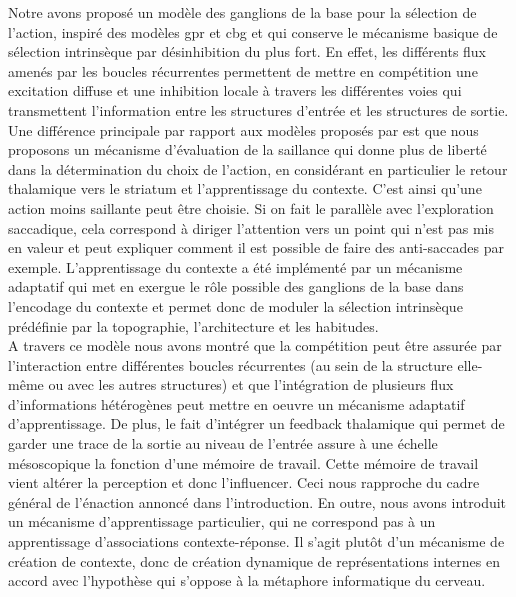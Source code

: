 Notre avons proposé un modèle des ganglions de la base pour la sélection de l'action, inspiré des modèles \gls{gpr} et \gls{cbg} et qui conserve le mécanisme basique de sélection intrinsèque par désinhibition du plus fort. En effet, les différents flux amenés par les boucles récurrentes permettent de mettre en compétition une excitation diffuse et une inhibition locale à travers les différentes voies qui transmettent l'information entre les structures d'entrée et les structures de sortie. Une différence principale par rapport aux modèles proposés par \cite{Gurney:2001a, Girard:2008} est que nous proposons un mécanisme d'évaluation de la saillance qui donne plus de liberté dans la détermination du choix de l'action, en considérant en particulier le retour thalamique vers le striatum et l'apprentissage du contexte. C'est ainsi qu'une action moins saillante peut être choisie. Si on fait le parallèle avec l'exploration saccadique, cela correspond à diriger l'attention vers un point qui n'est pas mis en valeur et peut expliquer comment il est possible de faire des anti-saccades par exemple. L'apprentissage du contexte a été implémenté par un mécanisme adaptatif qui met en exergue le rôle possible des ganglions de la base dans l'encodage du contexte et permet donc de moduler la sélection intrinsèque prédéfinie par la topographie, l'architecture et les habitudes.\\%

A travers ce modèle nous avons montré que la compétition peut être assurée par l'interaction entre différentes boucles récurrentes (au sein de la structure elle-même ou avec les autres structures) et que l'intégration de plusieurs flux d'informations hétérogènes peut mettre en oeuvre un mécanisme adaptatif d'apprentissage. De plus, le fait d'intégrer un feedback thalamique qui permet de garder une trace de la sortie au niveau de l'entrée assure à une échelle mésoscopique la fonction d'une mémoire de travail. Cette mémoire de travail vient altérer la perception et donc l'influencer. Ceci nous rapproche du cadre général de l'énaction annoncé dans l'introduction. En outre, nous avons introduit un mécanisme d'apprentissage particulier, qui ne correspond pas à un apprentissage d'associations contexte-réponse. Il s'agit plutôt d'un mécanisme de création de contexte, donc de création dynamique de représentations internes en accord avec l'hypothèse qui s'oppose à la métaphore informatique du cerveau.\\%

